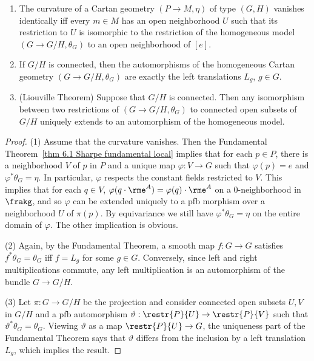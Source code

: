 \begin{prop}\label{prop 1.5.2 Cap}
    \begin{enumerate}[label=(\arabic*)]
        \item The curvature of a Cartan geometry $(P\to M,\eta)$ of type $(G,H)$ vanishes identically iff every $m\in M$ has an open neighborhood $U$ such that its restriction to $U$ is isomorphic to the restriction of the homogeneous model $(G\to G\slash H,\theta_G)$ to an open neighborhood of $[e]$.
        \item If $G\slash H$ is connected, then the automorphisms of the homogeneous Cartan geometry $(G\to G\slash H,\theta_G)$ are exactly the left translations $L_g$, $g\in G$.
        \item (Liouville Theorem) Suppose that $G\slash H$ is connected. Then any isomorphism between two restrictions of $(G\to G\slash H,\theta_G)$ to connected open subsets of $G\slash H$ uniquely extends to an automorphism of the homogeneous model.
    \end{enumerate}
\end{prop}
\begin{proof}
    (1) Assume that the curvature vanishes. Then the Fundamental Theorem~\ref{thm 6.1 Sharpe fundamental local} implies that for each $p\in P$, there is a neighborhood $V$ of $p$ in $P$ and a unique map $\varphi:V\to G$ such that $\varphi(p)=e$ and $\varphi^\ast\theta_G=\eta$. In particular, $\varphi$ respects the constant fields restricted to $V$. This implies that for each $q\in V$, $\varphi(q\cdot \rme^{A})=\varphi(q)\cdot \rme^{A}$ on a $0$-neighborhood in $\frakg$, and so $\varphi$ can be extended uniquely to a \gls{pfb} morphism over a neighborhood $U$ of $\pi(p)$. By equivariance we still have $\varphi^\ast\theta_G=\eta$ on the entire domain of $\varphi$. The other implication is obvious.

    (2) Again, by the Fundamental Theorem, a smooth map $f:G\to G$ satisfies $f^\ast\theta_G=\theta_G$ iff $f=L_g$ for some $g\in G$. Conversely, since left and right multiplications commute, any left multiplication is an automorphism of the bundle $G\to G\slash H$.

    (3) Let $\pi:G\to G\slash H$ be the projection and consider connected open subsets $U,V$ in $G\slash H$ and a \gls{pfb} automorphism $\vartheta:\restr{P}{U}\to \restr{P}{V}$ such that $\vartheta^\ast\theta_G=\theta_G$. Viewing $\vartheta$ as a map $\restr{P}{U}\to G$, the uniqueness part of the Fundamental Theorem says that $\vartheta$ differs from the inclusion by a left translation $L_g$, which implies the result.
\end{proof}


